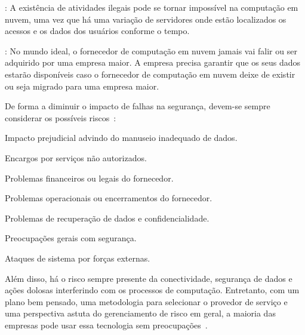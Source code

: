 \begin{itemise}
    : A existência de atividades ilegais pode se tornar 
    impossível na computação em nuvem, uma vez que há uma variação de servidores 
    onde estão localizados os acessos e os dados dos usuários conforme o tempo.
    
    : No mundo ideal, o fornecedor de computação
    em nuvem jamais vai falir ou ser adquirido por uma empresa maior. A empresa
    precisa garantir que os seus dados estarão disponíveis caso o fornecedor de
    computação em nuvem deixe de existir ou seja migrado para uma empresa maior.

\end{itemise}

\undef\itemm

De forma a diminuir o impacto de falhas na segurança, devem-se sempre considerar os
possíveis riscos~\cite{cloud-computing-fundamentals}:
\begin{itemise}
    \item Impacto prejudicial advindo do manuseio inadequado de dados.
    \item Encargos por serviços não autorizados.
    \item Problemas financeiros ou legais do fornecedor.
    \item Problemas operacionais ou encerramentos do fornecedor.
    \item Problemas de recuperação de dados e confidencialidade.
    \item Preocupações gerais com segurança.
    \item Ataques de sistema por forças externas.
\end{itemise}

Além disso, há o risco sempre presente da conectividade, segurança de dados e
ações dolosas interferindo com os processos de computação. Entretanto, com um
plano bem pensado, uma metodologia para selecionar o provedor de serviço e uma
perspectiva astuta do gerenciamento de risco em geral, a maioria das empresas
pode usar essa tecnologia sem preocupações~\cite{cloud-computing-fundamentals}.
